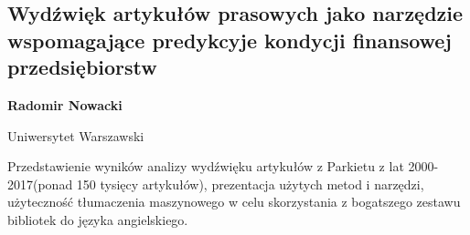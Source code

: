 \documentclass[\main/boa.tex]{subfiles}
\begin{document}
\subsection{Wydźwięk artykułów prasowych jako narzędzie wspomagające predykcyje kondycji finansowej przedsiębiorstw}

\begin{minipage}{0.915\textwidth}
	\centering
  {\bf {} Radomir Nowacki}
\end{minipage}



\begin{affiliations}
\begin{minipage}{0.915\textwidth}
\centering
Uniwersytet Warszawski  \\[-2pt]
\end{minipage}
\end{affiliations}

\vskip 0.3cm

 Przedstawienie wyników analizy wydźwięku artykułów z Parkietu z lat 2000-2017(ponad 150 tysięcy artykułów), prezentacja użytych metod i narzędzi, użyteczność tłumaczenia maszynowego w celu skorzystania z bogatszego zestawu bibliotek do języka angielskiego. 
\end{document}

